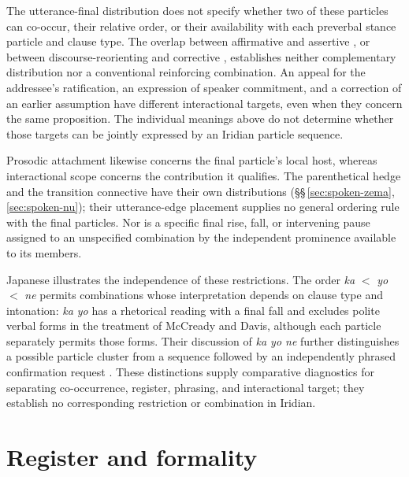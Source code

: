 The utterance-final distribution does not specify whether two of these
particles can co-occur, their relative order, or their availability with
each preverbal stance particle and clause type. The overlap between
affirmative  and assertive , or between
discourse-reorienting  and corrective , establishes
neither complementary distribution nor a conventional reinforcing
combination. An appeal for the addressee's ratification, an expression of
speaker commitment, and a correction of an earlier assumption have
different interactional targets, even when they concern the same
proposition. The individual meanings above do not determine whether those
targets can be jointly expressed by an Iridian particle sequence.

Prosodic attachment likewise concerns the final particle's local host,
whereas interactional scope concerns the contribution it qualifies.
The parenthetical hedge  and the transition connective
 have their own distributions
(§§\,\ref{sec:spoken-zema}, \ref{sec:spoken-nu}); their
utterance-edge placement supplies no general ordering rule with the final
particles. Nor is a specific final rise, fall, or intervening pause assigned
to an unspecified combination by the independent prominence available to
its members.

Japanese illustrates the independence of these restrictions. The order
\textit{ka} $<$ \textit{yo} $<$ \textit{ne} permits combinations whose interpretation depends
on clause type and intonation: \textit{ka yo} has a rhetorical reading
with a final fall and excludes polite verbal forms in the treatment of
McCready and Davis, although each particle separately permits those forms.
Their discussion of \textit{ka yo ne} further distinguishes a possible
particle cluster from a sequence followed by an independently phrased
confirmation request \cite[§5, manuscript pp.~21--25]{mccreadydavis2019particles}.
These distinctions supply comparative diagnostics for separating
co-occurrence, register, phrasing, and interactional target; they establish
no corresponding restriction or combination in Iridian.

%
%

\section{Register and formality}\label{sec:register}\label{sec:register-discourse}


